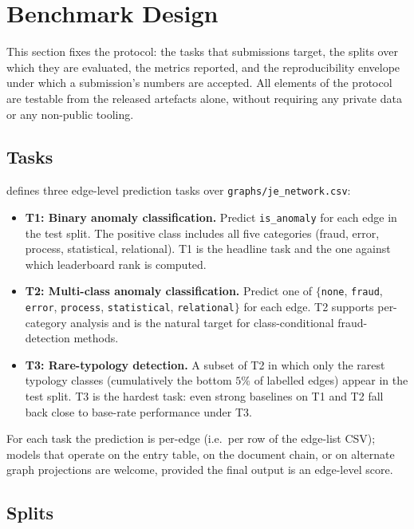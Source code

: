 \section{Benchmark Design}
\label{sec:benchmark}

This section fixes the \bench{} protocol: the tasks that submissions
target, the splits over which they are evaluated, the metrics
reported, and the reproducibility envelope under which a
submission's numbers are accepted.  All elements of the protocol are
testable from the released artefacts alone, without requiring
any private data or any non-public tooling.

\subsection{Tasks}
\label{sec:benchmark:tasks}

\bench{} defines three edge-level prediction tasks over
\texttt{graphs/je\_network.csv}:

\begin{itemize}
  \item \textbf{T1: Binary anomaly classification.}  Predict
    \texttt{is\_anomaly} for each edge in the test split.  The
    positive class includes all five categories
    (fraud, error, process, statistical, relational).  T1 is the
    headline task and the one against which leaderboard rank is
    computed.
  \item \textbf{T2: Multi-class anomaly classification.}  Predict
    one of $\{$\texttt{none}, \texttt{fraud}, \texttt{error},
    \texttt{process}, \texttt{statistical}, \texttt{relational}$\}$
    for each edge.  T2 supports per-category analysis and is the
    natural target for class-conditional fraud-detection methods.
  \item \textbf{T3: Rare-typology detection.}  A subset of T2 in
    which only the rarest typology classes (cumulatively the
    bottom $5\%$ of labelled edges) appear in the test split.
    T3 is the hardest task: even strong baselines on T1 and T2
    fall back close to base-rate performance under T3.
\end{itemize}

For each task the prediction is per-edge (i.e.\ per row of the
edge-list CSV); models that operate on the entry table, on the
document chain, or on alternate graph projections are welcome,
provided the final output is an edge-level score.

\subsection{Splits}
\label{sec:benchmark:splits}

